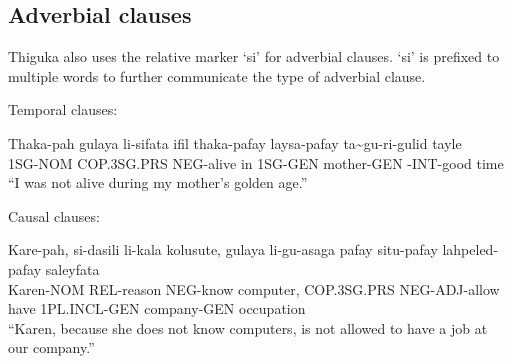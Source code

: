 \subsection{Adverbial clauses}
Thiguka also uses the relative marker `si' for adverbial clauses. `si' is prefixed to
multiple words to further communicate the type of adverbial clause.

Temporal clauses:
\begin{exe}
    \ex{} \gll{}Thaka-pah gulaya      li-sifata ifil thaka-pafay laysa-pafay ta\~{}gu-ri-gulid  tayle\\
                1SG-NOM   COP.3SG.PRS NEG-alive in   1SG-GEN     mother-GEN  \agradj{}-INT-good time\\
          \glt{}``I was not alive during my mother's golden age.''
\end{exe}

Causal clauses:
\begin{exe}
    \ex{} \gll{}Kare-pah, si-dasili  li-kala  kolusute, gulaya      li-gu-asaga   pafay situ-pafay   lahpeled-pafay saleyfata\\
    Karen-NOM REL-reason NEG-know computer, COP.3SG.PRS NEG-ADJ-allow have  1PL.INCL-GEN company-GEN    occupation\\
    \glt{}``Karen, because she does not know computers, is not allowed to have a job at our company.''
\end{exe}
